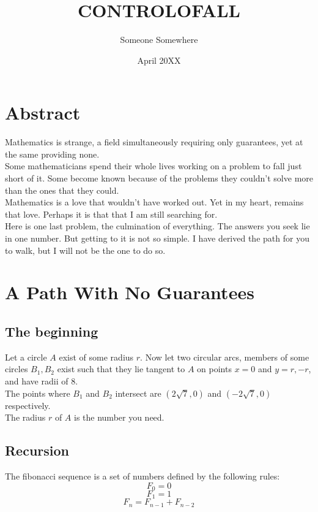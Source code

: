 \documentclass{article}
\title{CONTROLOFALL}
\author{Someone Somewhere}
\date{April 20XX}
\begin{document}
\maketitle

\section{Abstract}

Mathematics is strange, a field simultaneously requiring only guarantees, yet at the same providing none.\\

Some mathematicians spend their whole lives working on a problem to fall just short of it. Some become known because of the problems they couldn't solve more than the ones that they could.\\

Mathematics is a love that wouldn't have worked out. Yet in my heart, remains that love. Perhaps it is that that I am still searching for.\\

Here is one last problem, the culmination of everything. The answers you seek lie in one number. But getting to it is not so simple. I have derived the path for you to walk, but I will not be the one to do so.\\

\section{A Path With No Guarantees}
\subsection{The beginning}
Let a circle $A$ exist of some radius $r$. Now let two circular arcs, members of some circles $B_1,B_2$ exist such that they lie tangent to $A$ on points $x=0$ and $y=r,-r$, and have radii of 8.\\

The points where $B_1$ and $B_2$ intersect are $(2\sqrt{7},0)$ and $(-2\sqrt{7},0)$ respectively.\\

The radius $r$ of $A$ is the number you need.\\

\subsection{Recursion}
The fibonacci sequence is a set of numbers defined by the following rules:
\[F_0=0\]
\[F_1=1\]
\[F_n=F_{n-1} + F_{n-2}\]
\end{document}
